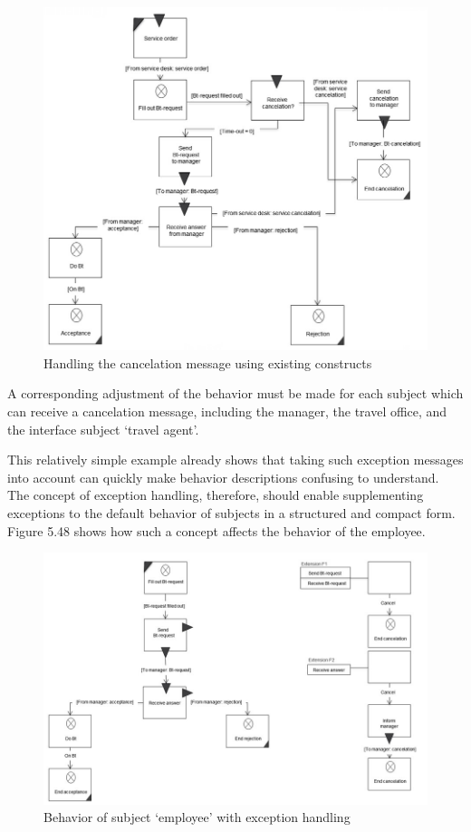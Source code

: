 \begin{figure}[ph]
\centering
\includegraphics[width=0.7\linewidth]{20181026-Ontologie-Bilder/Grafiken-Ontologie/SUbjectExecution/ExceptionHandling}
\caption[Handling the cancelation message using existing constructs]{Handling the cancelation message using existing constructs}
\label{fig:exceptionhandling}
\end{figure}


A corresponding adjustment of the behavior must be made for each subject which can receive a cancelation message, including the manager, the travel office, and the interface subject ‘travel agent’.

This relatively simple example already shows that taking such exception messages into account can quickly make behavior descriptions confusing to understand. The concept of exception handling, therefore, should enable supplementing exceptions to the default behavior of subjects in a structured and compact form. Figure 5.48 shows how such a concept affects the behavior of the employee.

\newpage

\begin{figure}[ph!]
	\centering
	\includegraphics[width=0.7\linewidth]{20181026-Ontologie-Bilder/Grafiken-Ontologie/SUbjectExecution/Extension}
	\caption[Behavior of subject ‘employee’ with exception handling]{Behavior of subject ‘employee’ with exception handling}
	\label{fig:extension}
\end{figure}

